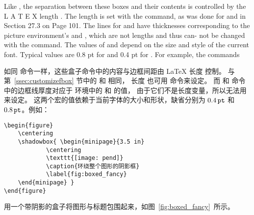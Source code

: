 Like \fbox, the separation between these boxes and their contents is controlled
by the L
A T E X length \fboxsep. The length \shadowsize is set with the \setlength
command, as was done for \fboxrule and \fboxsep in Section 27.3 on Page 101.
The lines for \ovalbox and \Ovalbox have thicknesses corresponding to the picture
environment’s \thicklines and \thinlines, which are not lengths and thus can-
not be changed with the \setlength command. The values of \thicklines and
\thinlines depend on the size and style of the current font. Typical values are
0.8 pt for \thicklines and 0.4 pt for \thinlines. For example, the commands

如同  命令一样，这些盒子命令中的内容与边框间距由 \LaTeX{} 长度  控制。
与第~\ref{ssec:customizefbox} 节中的  和  相同，
长度  也可用  命令来设定。
而  和  命令中的边框线厚度对应于  环境中的  和  的值，
由于它们不是长度变量，所以无法用  来设定。
这两个宏的值依赖于当前字体的大小和形状，缺省分别为 $0.4\,\mathtt{pt}$ 和 $0.8\,\mathtt{pt}$。例如：
\begin{lstlisting}
\begin{figure}
	\centering
	\shadowbox{ \begin{minipage}{3.5 in}
			\centering
			\texttt{[image: pend]}
			\caption{环绕整个图形的阴影框}
			\label{fig:boxed_fancy}
	\end{minipage} }
\end{figure}
\end{lstlisting}
用一个带阴影的盒子将图形与标题包围起来，如图~\ref{fig:boxed_fancy}~所示。

\begin{figure}
	\centering
\end{figure}




\endinput
